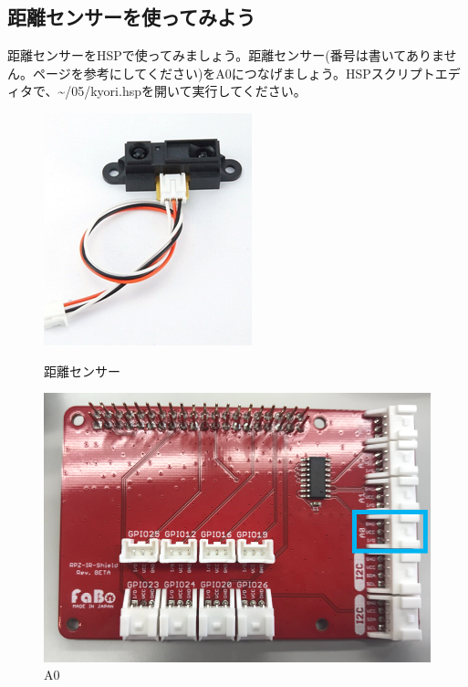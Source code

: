 \subsection{距離センサーを使ってみよう}
距離センサーをHSPで使ってみましょう。距離センサー(番号は書いてありません。\pageref{distance}ページを参考にしてください)をA0につなげましょう。HSPスクリプトエディタで、\textasciitilde /05/kyori.hspを開いて実行してください。
\begin{figure}[H]
  \begin{minipage}[t]{0.3\columnwidth}
    \centering
 \includegraphics[width=\linewidth]{images/chap05/text05-img031.png}
    \caption{距離センサー}
  \end{minipage}
  \begin{minipage}[t]{0.5\columnwidth}
    \centering
    \includegraphics[width=\linewidth]{images/chap05/text05-img030.png}
    \caption{A0}
  \end{minipage}
\end{figure}

